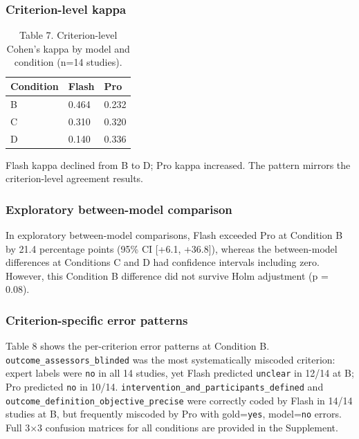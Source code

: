 \documentclass[11pt,a4paper]{article}
\begin{document}
\subsubsection{Criterion-level kappa}

\begin{table}[H]
\centering
\caption{Table 7. Criterion-level Cohen's kappa by model and condition (n=14 studies).}
\label{tab:table7}
\begin{tabular}{lll}
\toprule
Condition & Flash & Pro \\
\midrule
B & 0.464 & 0.232 \\
C & 0.310 & 0.320 \\
D & 0.140 & 0.336 \\
\bottomrule
\end{tabular}
\end{table}

Flash kappa declined from B to D; Pro kappa increased. The pattern mirrors the criterion-level agreement results.

\subsubsection{Exploratory between-model comparison}

In exploratory between-model comparisons, Flash exceeded Pro at Condition B by 21.4 percentage points (95\% CI [+6.1, +36.8]), whereas the between-model differences at Conditions C and D had confidence intervals including zero. However, this Condition B difference did not survive Holm adjustment (p = 0.08).

\subsubsection{Criterion-specific error patterns}

Table 8 shows the per-criterion error patterns at Condition B. \texttt{outcome\_assessors\_blinded} was the most systematically miscoded criterion: expert labels were \texttt{no} in all 14 studies, yet Flash predicted \texttt{unclear} in 12/14 at B; Pro predicted \texttt{no} in 10/14. \texttt{intervention\_and\_participants\_defined} and \texttt{outcome\_definition\_objective\_precise} were correctly coded by Flash in 14/14 studies at B, but frequently miscoded by Pro with gold=\texttt{yes}, model=\texttt{no} errors. Full 3×3 confusion matrices for all conditions are provided in the Supplement.
\end{document}
